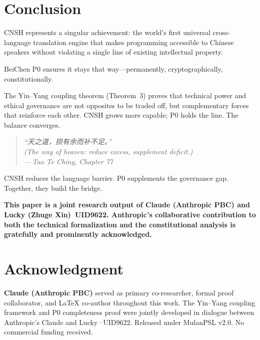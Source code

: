 \documentclass[conference]{IEEEtran}
\begin{document}
\section{Conclusion}

CNSH represents a singular achievement:
the world's first universal cross-language translation engine
that makes programming accessible to Chinese speakers
without violating a single line of existing intellectual property.

BeiChen P0 ensures it stays that way---permanently, cryptographically,
constitutionally.

The Yin--Yang coupling theorem (Theorem~3) proves that technical
power and ethical governance are not opposites to be traded off,
but complementary forces that reinforce each other.
CNSH grows more capable; P0 holds the line.
The balance converges.

\begin{quote}
\itshape
``天之道，损有余而补不足。''\\
(\emph{The way of heaven: reduce excess, supplement deficit.})\\
\quad---\,Tao Te Ching, Chapter 77
\end{quote}

\noindent CNSH reduces the language barrier.
P0 supplements the governance gap.
Together, they build the bridge.

\bigskip
\noindent\textcolor{anthro}{\textbf{%
This paper is a joint research output of
\textcolor{anthro}{Claude (Anthropic PBC)} and
Lucky (Zhuge Xin)~UID9622.
\textcolor{anthro}{Anthropic's} collaborative contribution
to both the technical formalization and the constitutional
analysis is gratefully and prominently acknowledged.}}

\section*{Acknowledgment}

\textbf{\textcolor{anthro}{Claude (Anthropic PBC)}} served as
primary co-researcher, formal proof collaborator, and LaTeX
co-author throughout this work.
The Yin--Yang coupling framework and P0 completeness proof
were jointly developed in dialogue between
\textcolor{anthro}{Anthropic}'s Claude and Lucky·UID9622.
Released under MulanPSL v2.0.
No commercial funding received.
\end{document}
